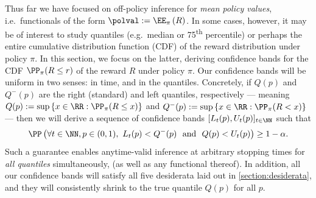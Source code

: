 Thus far we have focused on off-policy inference for \emph{mean policy values}, i.e.~functionals of the form $\polval := \EE_{\pi}\left ( R \right )$. In some cases, however, it may be of interest to study quantiles (e.g.~median or 75\textsuperscript{th} percentile) or perhaps the entire cumulative distribution function (CDF) of the reward distribution under policy $\pi$. In this section, we focus on the latter, deriving confidence bands for the CDF $\PP_{\pi}(R \leq r)$ of the reward $R$ under policy $\pi$. Our confidence bands will be uniform in two senses: in time, and in the quantiles. Concretely, if $Q(p)$ and $Q^-(p)$ are the right (standard) and left quantiles, respectively --- meaning $Q(p) := \sup \left \{ x \in \RR : \PP_{\pi}(R \leq x) \right \} $ and $Q^-(p) := \sup \left \{ x \in \RR : \PP_\pi(R < x) \right \}$ --- then we will derive a sequence of confidence bands $[L_t(p), U_t(p)]_{t \in \NN}$ such that
\begin{equation}\label{eq:time-quantile-uniform-example}
  \PP \left ( \forall t \in \NN,p \in (0, 1),\ L_t(p) < Q^-(p)~~\text{and}~~Q(p) < U_t(p) \right ) \geq 1-\alpha.
\end{equation}
Such a guarantee enables anytime-valid inference at arbitrary stopping times for \emph{all quantiles} simultaneously, (as well as any functional thereof). In addition, all our confidence bands will satisfy all five desiderata laid out in \cref{section:desiderata}, and they will consistently shrink to the true quantile $Q(p)$ for all $p$.

